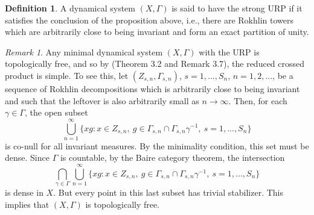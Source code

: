 \documentclass[12pt, oneside, psamsfonts]{amsart}
\theoremstyle{definition}
\newtheorem{defn}[thm]{Definition}
\theoremstyle{remark}
\newtheorem{rem}[thm]{Remark}
\numberwithin{equation}{section}
\begin{document}
\begin{defn}\label{defn-S-URP}
A dynamical system $(X, \Gamma)$ is said to have the strong URP if it satisfies the conclusion of the proposition above, i.e., there are Rokhlin towers which are arbitrarily close to being invariant 
and form an exact partition of unity. 
\end{defn}

\begin{rem}\label{tp-free}
Any minimal dynamical system $(X, \Gamma)$ with the URP is topologically free, and so by \cite{Elliott_1980} (Theorem 3.2 and Remark 3.7), the reduced crossed product is simple. To see this,  let $(Z_{s, n}, \Gamma_{s, n})$, $s=1, ..., S_n$, $n=1, 2, ...$, be a sequence of Rokhlin decompositions which is arbitrarily close to being invariant and such that the leftover is also arbitrarily small as $n \to \infty$. Then, for each $\gamma \in \Gamma$, the open subset
$$ \bigcup_{n=1}^\infty  \{ x g : x \in Z_{s, n},\ g \in \Gamma_{s, n} \cap \Gamma_{s, n} \gamma^{-1},\ s=1, ..., S_n \} $$ is co-null for all invariant measures. By the minimality condition, this set must be dense. Since $\Gamma$ is countable, by the Baire category theorem, the intersection $$ \bigcap_{\gamma \in \Gamma} \bigcup_{n=1}^\infty  \{ x g : x \in Z_{s, n},\ g \in \Gamma_{s, n} \cap \Gamma_{s, n} \gamma^{-1},\ s=1, ..., S_n \} $$ is dense in $X$. But every point in this last subset has trivial stabilizer. This implies that $(X, \Gamma)$ is topologically free.

\end{rem}
\end{document}
